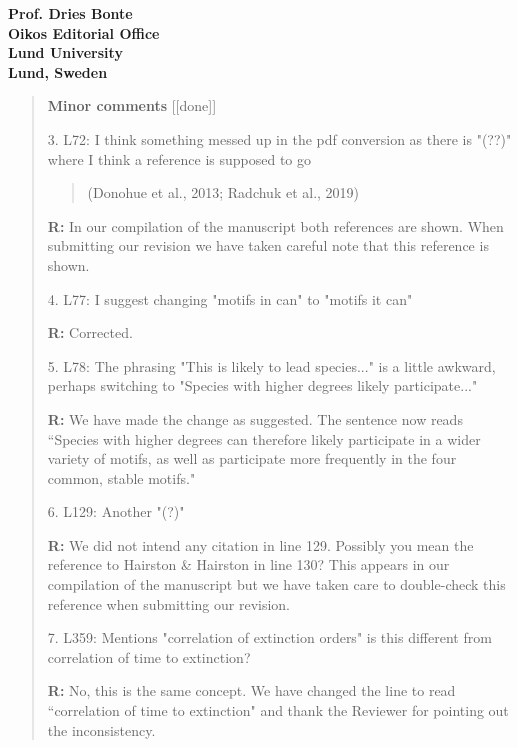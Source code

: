 \documentclass[12pt]{letter}
\begin{document}
\begin{letter}{\bf Prof. Dries Bonte\\
Oikos Editorial Office \\
Lund University \\
Lund, Sweden}
\begin{quotation}
    \smallskip


  \textbf{Minor comments} [[done]]

    3. L72: I think something messed up in the pdf conversion as there is "(??)" where I think a reference is supposed to go
    \begin{quotation}
    (Donohue et al., 2013; Radchuk et al., 2019)
    \end{quotation}

    \smallskip

    \textbf{R:} In our compilation of the manuscript both references are shown. When submitting our revision we have taken careful note that this reference is shown.

    \smallskip

    4. L77: I suggest changing "motifs in can" to "motifs it can"

    \smallskip

    \textbf{R:} Corrected.

    \smallskip

    5. L78: The phrasing "This is likely to lead species..." is a little awkward, perhaps switching to "Species with higher degrees likely participate..."

    \smallskip

    \textbf{R:} We have made the change as suggested. The sentence now reads ``Species with higher degrees can therefore likely participate in a wider variety of motifs, as well as participate more frequently in the four common, stable motifs."

    \smallskip

    6. L129: Another "(?)"

    \smallskip

    \textbf{R:} We did not intend any citation in line 129. Possibly you mean the reference to Hairston \& Hairston in line 130? This appears in our compilation of the manuscript but we have taken care to double-check this reference when submitting our revision.%

    \smallskip

    7. L359: Mentions "correlation of extinction orders" is this different from correlation of time to extinction?

    \smallskip

    \textbf{R:} No, this is the same concept. We have changed the line to read ``correlation of time to extinction" and thank the Reviewer for pointing out the inconsistency.


\end{quotation}
\end{letter}
\end{document}
